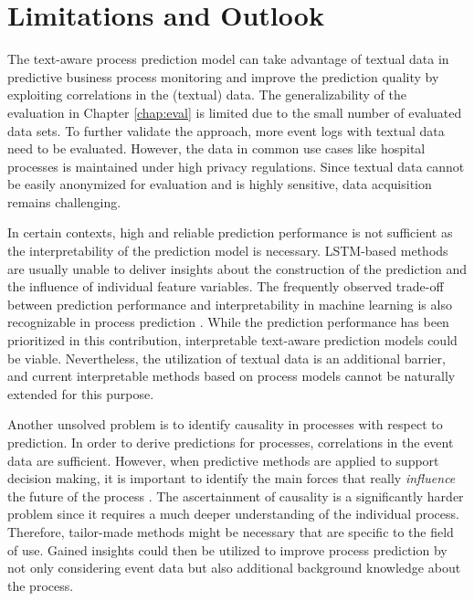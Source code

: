 \section{Limitations and Outlook}

The text-aware process prediction model can take advantage of textual data in predictive business process monitoring and improve the prediction quality by exploiting correlations in the (textual) data.
The generalizability of the evaluation in Chapter \ref{chap:eval} is limited due to the small number of evaluated data sets.
To further validate the approach, more event logs with textual data need to be evaluated.
However, the data in common use cases like hospital processes is maintained under high privacy regulations.
Since textual data cannot be easily anonymized for evaluation and is highly sensitive, data acquisition remains challenging.

In certain contexts, high and reliable prediction performance is not sufficient as the interpretability of the prediction model is necessary.
LSTM-based methods are usually unable to deliver insights about the construction of the prediction and the influence of individual feature variables.
The frequently observed trade-off between prediction performance and interpretability in machine learning is also recognizable in process prediction \cite{DBLP:journals/sosym/TaxTZ20}.
While the prediction performance has been prioritized in this contribution, interpretable text-aware prediction models could be viable.
Nevertheless, the utilization of textual data is an additional barrier, and current interpretable methods based on process models cannot be naturally extended for this purpose.

Another unsolved problem is to identify causality in processes with respect to prediction.
In order to derive predictions for processes, correlations in the event data are sufficient.
However, when predictive methods are applied to support decision making, it is important to identify the main forces that really \textit{influence} the future of the process \cite{DBLP:conf/caise/HompesMRDBA17}.
The ascertainment of causality is a significantly harder problem since it requires a much deeper understanding of the individual process.
Therefore, tailor-made methods might be necessary that are specific to the field of use.
Gained insights could then be utilized to improve process prediction by not only considering event data but also additional background knowledge about the process.

